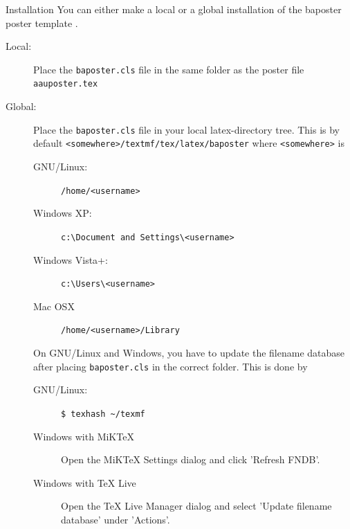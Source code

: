 \documentclass{article}
\begin{document}
\begin{poster}
\begin{posterbox}[name=install,span=2,column=1,row=0]{Installation}
You can either make a local or a global installation of the baposter poster template \cite{baposter}.
\begin{description}
  \item[Local:] Place the {\tt baposter.cls} file in the same folder as the poster file {\tt aauposter.tex}
  \item[Global:] Place the {\tt baposter.cls} file in your local latex-directory tree. This is by default {\tt <somewhere>/textmf/tex/latex/baposter} where {\tt <somewhere>} is
  \begin{description}
    \item[GNU/Linux:] {\tt/home/<username>}
    \item[Windows XP:] {\tt c:\textbackslash Document and Settings\textbackslash<username>}
    \item[Windows Vista+:] {\tt c:\textbackslash Users\textbackslash<username>}
    \item[Mac OSX] {\tt/home/<username>/Library}
  \end{description}
  On GNU/Linux and Windows, you have to update the filename database after placing {\tt baposter.cls} in the correct folder. This is done by
  \begin{description}
    \item[GNU/Linux:] {\tt \$ texhash \textasciitilde /texmf}
    \item[Windows with MiKTeX] Open the MiKTeX Settings dialog and click 'Refresh FNDB'.
    \item[Windows with TeX Live] Open the TeX Live Manager dialog and select 'Update filename database' under 'Actions'.
  \end{description}
\end{description}
\end{posterbox}


\end{poster}
\end{document}
